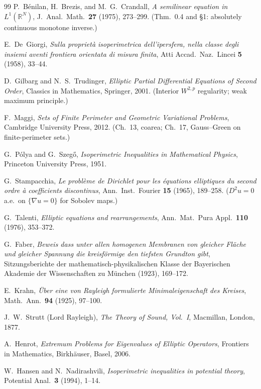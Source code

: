 \documentclass[11pt]{amsart}
\theoremstyle{definition}
\newcommand{\R}{\mathbb R}
\begin{document}
\begin{thebibliography}{99}
P.~B\'enilan, H.~Brezis, and M.~G.~Crandall,
\emph{A semilinear equation in \(L^1(\R^N)\)},
J.~Anal.\ Math.\ \textbf{27} (1975), 273--299.
(Thm.~0.4 and \S1: absolutely continuous monotone inverse.)

E.~De~Giorgi,
\emph{Sulla propriet\`a isoperimetrica dell'ipersfera, nella classe degli
insiemi aventi frontiera orientata di misura finita},
Atti Accad.\ Naz.\ Lincei \textbf{5} (1958), 33--44.

D.~Gilbarg and N.~S.~Trudinger,
\emph{Elliptic Partial Differential Equations of Second Order},
Classics in Mathematics, Springer, 2001.
(Interior \(W^{2,p}\) regularity; weak maximum principle.)

F.~Maggi,
\emph{Sets of Finite Perimeter and Geometric Variational Problems},
Cambridge University Press, 2012.
(Ch.~13, coarea; Ch.~17, Gauss--Green on finite-perimeter sets.)

G.~P\'olya and G.~Szeg\H{o},
\emph{Isoperimetric Inequalities in Mathematical Physics},
Princeton University Press, 1951.

G.~Stampacchia,
\emph{Le probl\`eme de Dirichlet pour les \'equations elliptiques du second
ordre \`a coefficients discontinus},
Ann.\ Inst.\ Fourier \textbf{15} (1965), 189--258.
(\(D^2u=0\) a.e.\ on \(\{\nabla u=0\}\) for Sobolev maps.)

G.~Talenti,
\emph{Elliptic equations and rearrangements},
Ann.\ Mat.\ Pura Appl.\ \textbf{110} (1976), 353--372.

G.~Faber,
\emph{Beweis dass unter allen homogenen Membranen von gleicher Fl\"ache und
gleicher Spannung die kreisf\"ormige den tiefsten Grundton gibt},
Sitzungsberichte der mathematisch-physikalischen Klasse der Bayerischen
Akademie der Wissenschaften zu M\"unchen (1923), 169--172.

E.~Krahn,
\emph{\"Uber eine von Rayleigh formulierte Minimaleigenschaft des Kreises},
Math.\ Ann.\ \textbf{94} (1925), 97--100.

J.~W.~Strutt (Lord Rayleigh),
\emph{The Theory of Sound, Vol.~I},
Macmillan, London, 1877.

A.~Henrot,
\emph{Extremum Problems for Eigenvalues of Elliptic Operators},
Frontiers in Mathematics, Birkh\"auser, Basel, 2006.

W.~Hansen and N.~Nadirashvili,
\emph{Isoperimetric inequalities in potential theory},
Potential Anal.\ \textbf{3} (1994), 1--14.


\end{thebibliography}
\end{document}
